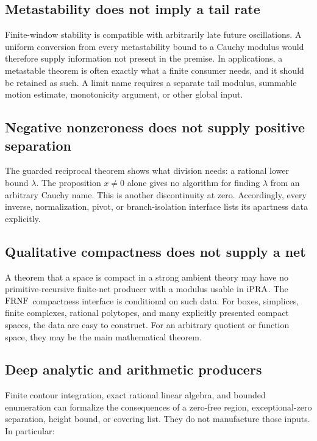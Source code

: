 \subsection{Metastability does not imply a tail rate}

Finite-window stability is compatible with arbitrarily late future oscillations.  A
uniform conversion from every metastability bound to a Cauchy modulus would therefore
supply information not present in the premise.  In applications, a metastable theorem
is often exactly what a finite consumer needs, and it should be retained as such.  A
limit name requires a separate tail modulus, summable motion estimate, monotonicity
argument, or other global input.

\subsection{Negative nonzeroness does not supply positive separation}

The guarded reciprocal theorem shows what division needs: a rational lower bound
\(\lambda\).  The proposition \(x\ne0\) alone gives no algorithm for finding
\(\lambda\) from an arbitrary Cauchy name.  This is another discontinuity at zero.
Accordingly, every inverse, normalization, pivot, or branch-isolation interface lists
its apartness data explicitly.

\subsection{Qualitative compactness does not supply a net}

A theorem that a space is compact in a strong ambient theory may have no
primitive-recursive finite-net producer with a modulus usable in \(\mathrm{iPRA}\).  The
\(\mathrm{FRNF}\) compactness interface is conditional on such data.  For boxes, simplices,
finite complexes, rational polytopes, and many explicitly presented compact spaces,
the data are easy to construct.  For an arbitrary quotient or function space, they may
be the main mathematical theorem.

\subsection{Deep analytic and arithmetic producers}

Finite contour integration, exact rational linear algebra, and bounded enumeration can
formalize the consequences of a zero-free region, exceptional-zero separation, height
bound, or covering list.  They do not manufacture those inputs.  In particular:


